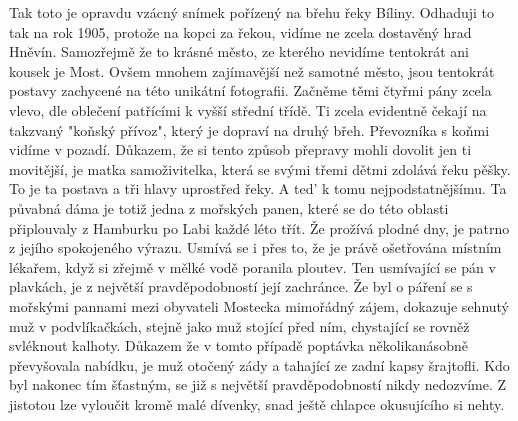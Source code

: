 
Tak toto je opravdu vzácný snímek pořízený na břehu řeky Bíliny.
Odhaduji to tak na rok 1905, protože na kopci za řekou, vidíme ne
zcela dostavěný hrad Hněvín. Samozřejmě že to krásné město, ze kterého
nevidíme tentokrát ani kousek je Most. Ovšem mnohem zajímavější než
samotné město, jsou tentokrát postavy zachycené na této unikátní
fotografii. Začněme těmi čtyřmi pány zcela vlevo, dle oblečení
patřícími k vyšší střední třídě. Ti zcela evidentně čekají na takzvaný
"koňský přívoz", který je dopraví na druhý břeh. Převozníka s koňmi
vidíme v pozadí. Důkazem, že si tento způsob přepravy mohli dovolit
jen ti movitější, je matka samoživitelka, která se svými třemi dětmi
zdolává řeku pěšky. To je ta postava a tři hlavy uprostřed řeky. A
ted' k tomu nejpodstatnějšímu. Ta půvabná dáma je totiž jedna z
mořských panen, které se do této oblasti připlouvaly z Hamburku po
Labi každé léto třít. Že prožívá plodné dny, je patrno z jejího
spokojeného výrazu. Usmívá se i přes to, že je právě ošetřována
místním lékařem, když si zřejmě v mělké vodě poranila ploutev. Ten
usmívající se pán v plavkách, je z největší pravděpodobností její
zachránce. Že byl o páření se s mořskými pannami mezi obyvateli
Mostecka mimořádný zájem, dokazuje sehnutý muž v podvlíkačkách, stejně
jako muž stojící před ním, chystající se rovněž svléknout kalhoty.
Důkazem že v tomto případě poptávka několikanásobně převyšovala
nabídku, je muž otočený zády a tahající ze zadní kapsy šrajtofli. Kdo
byl nakonec tím šťastným, se již s největší pravděpodobností nikdy
nedozvíme. Z jistotou lze vyloučit kromě malé dívenky, snad ještě
chlapce okusujícího si nehty.
